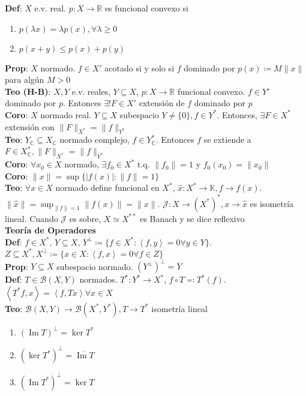 \documentclass[9pt]{extarticle}
\newcommand{\C}{\mathbb{C}}
\newcommand{\R}{\mathbb{R}}
\newcommand{\K}{\mathbb{K}}
\newcommand{\inn}[1]{\left\langle #1\right\rangle}
\begin{document}
\begin{multicols*}{2}
\textbf{Def}: $X$ e.v. real. $p:X\to\R$ es funcional convexo si\begin{enumerate}
	\item $p(\lambda x)=\lambda p(x),\forall \lambda\geq 0$
	\item $p(x+y)\leq p(x)+p(y)$
\end{enumerate}
\textbf{Prop}: $X$ normado. $f\in X'$ acotado si y solo si $f$ dominado por $p(x)\coloneqq M\|x\|$ para algún $M>0$\\
\textbf{Teo (H-B)}: $X,Y$ e.v. reales, $Y\subseteq X$, $p:X\to\R$ funcional convexo. $f\in Y'$ dominado por $p$. Entonces $\exists! F\in X'$ extensión de $f$ dominado por $p$\\
\textbf{Coro}: $X$ normado real. $Y\subseteq X$ subespacio $Y\neq \{0\},f\in Y^*$. Entonces, $\exists F\in X^*$ extensión con $\|F\|_{X^*}=\|f\|_{Y^*}$\\
\textbf{Teo}: $Y_\C\subseteq X_\C$ normado complejo, $f\in Y_\C^*$. Entonces $f$ se extiende a $F\in X_\C^*, \|F\|_{X^*}=\|f\|_{Y^*}$\\
\textbf{Coro}: $\forall x_0\in X$ normado, $\exists f_0\in X^*$ t.q. $\|f_0\|=1$ y $f_0(x_0)=\|x_0\|$\\
\textbf{Coro}: $\|x\|=\sup\{|f(x)|:\|f\|=1\}$\\
\textbf{Teo}: $\forall x\in X$ normado define funcional en $X^*$, $\hat x:X^*\to\K, f\to f(x)$. $\|\hat x\|=\sup_{\|f\|=1}\|f(x)\|=\|x\|$. $\mathcal{J}:X\to (X^*)^*, x\to\hat x$ es isometría lineal. Cuando $\mathcal{J}$ es sobre, $X\simeq X^{**}$ es Banach y se dice reflexivo\\
\large\textbf{Teoría de Operadores}\\\normalsize
\textbf{Def}: $f\in X^*$, $Y\subseteq X$, $Y^\perp\coloneqq \{f\in X^*:\inn{f,y}=0\forall y\in Y\}$. $Z\subseteq X^*, X^\perp\coloneqq \{x\in X:\inn{f,x}=0\forall f\in Z\}$\\
\textbf{Prop}: $Y\subseteq X$ subespacio normado. $(Y^\perp)^\perp=\overline{Y}$\\
\textbf{Def}: $T\in\mathcal{B}(X,Y)$ normados. $T^*:Y^*\to X^*$, $f\circ T\eqqcolon T^*(f)$. $\inn{T^* f,x}=\inn{f, Tx}\forall x\in X$\\
\textbf{Teo}: $\mathcal{B}(X,Y)\to\mathcal{B}(X^*,Y^*), T\to T^*$ isometría lineal\begin{enumerate}
	\item $(\operatorname{Im}T)^\perp=\operatorname{ker} T^*$
	\item $(\operatorname{ker} T^*)^\perp= \overline{\operatorname{Im}T}$
	\item $(\operatorname{Im}T^*)^\perp=\operatorname{ker}T$

\end{enumerate}
\end{multicols*}
\end{document}
